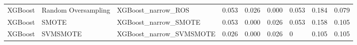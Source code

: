 \begin{tabular}{lllllllll}
                     XGBoost & Random Oversampling &                           XGBoost\_narrow\_ROS & 0.053 &                     0.026 &                 0.000 &                  0.053 &                                   0.184 &    0.079 \\
                     XGBoost &               SMOTE &                         XGBoost\_narrow\_SMOTE & 0.053 &                     0.000 &                 0.026 &                  0.053 &                                   0.158 &    0.105 \\
                     XGBoost &            SVMSMOTE &                      XGBoost\_narrow\_SVMSMOTE & 0.026 &                     0.000 &                 0.026 &                      0 &                                   0.105 &    0.105 \\
\bottomrule
\end{tabular}
